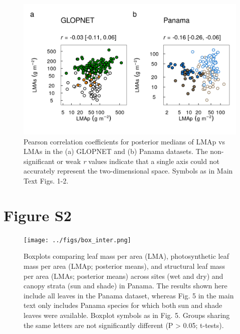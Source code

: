\documentclass[
  12pt,
  letterpaper,
  DIV=11,
  numbers=noendperiod]{scrartcl}
\begin{document}
\begin{figure}

{\centering \includegraphics{../figs/ps_point.png}

}

\caption{\label{fig-LMAp_LMAs}Pearson correlation coefficients for
posterior medians of LMAp vs LMAs in the (a) GLOPNET and (b) Panama
datasets. The non-significant or weak \emph{r} values indicate that a
single axis could not accurately represent the two-dimensional space.
Symbols as in Main Text Figs. 1-2.}

\end{figure}

\newpage

\hypertarget{figure-s2}{%
\section{Figure S2}\label{figure-s2}}

\begin{figure}

{\centering \texttt{[image: ../figs/box\_inter.png]}

}

\caption{\label{fig-box_inter}Boxplots comparing leaf mass per area
(LMA), photosynthetic leaf mass per area (LMAp; posterior means), and
structural leaf mass per area (LMAs; posterior means) across sites (wet
and dry) and canopy strata (sun and shade) in Panama. The results shown
here include all leaves in the Panama dataset, whereas Fig. 5 in the
main text only includes Panama species for which both sun and shade
leaves were available. Boxplot symbols as in Fig. 5. Groups sharing the
same letters are not significantly different (P \textgreater{} 0.05;
t-tests).}

\end{figure}
\end{document}
